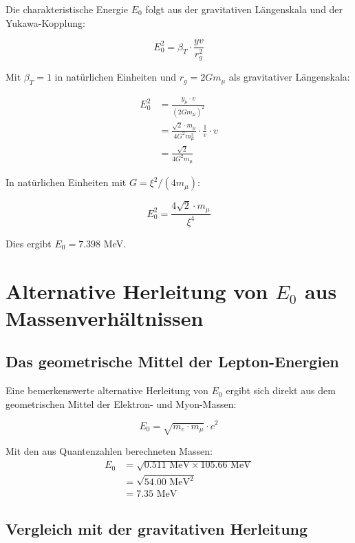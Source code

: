 	Die charakteristische Energie $E_0$ folgt aus der gravitativen Längenskala und der Yukawa-Kopplung:
	
	\begin{equation}
		E_0^2 = \beta_T \cdot \frac{yv}{r_g^2}
	\end{equation}
	
	Mit $\beta_T = 1$ in natürlichen Einheiten und $r_g = 2Gm_\mu$ als gravitativer Längenskala:
	
	\begin{align}
		E_0^2 &= \frac{y_\mu \cdot v}{(2Gm_\mu)^2}\\
		&= \frac{\sqrt{2} \cdot m_\mu}{4G^2 m_\mu^2} \cdot \frac{1}{v} \cdot v\\
		&= \frac{\sqrt{2}}{4G^2 m_\mu}
	\end{align}
	
	In natürlichen Einheiten mit $G = \xi^2/(4m_\mu)$:
	
	\begin{equation}
		E_0^2 = \frac{4\sqrt{2} \cdot m_\mu}{\xi^4}
	\end{equation}
	
	Dies ergibt $E_0 = 7.398$ MeV.
	
	\section{Alternative Herleitung von $E_0$ aus Massenverhältnissen}
	
	\subsection{Das geometrische Mittel der Lepton-Energien}
	
	Eine bemerkenswerte alternative Herleitung von $E_0$ ergibt sich direkt aus dem geometrischen Mittel der Elektron- und Myon-Massen:
	
	\begin{equation}
		E_0 = \sqrt{m_e \cdot m_\mu} \cdot c^2
	\end{equation}
	
	Mit den aus Quantenzahlen berechneten Massen:
	\begin{align}
		E_0 &= \sqrt{0.511 \text{ MeV} \times 105.66 \text{ MeV}}\\
		&= \sqrt{54.00 \text{ MeV}^2}\\
		&= 7.35 \text{ MeV}
	\end{align}
	
	\subsection{Vergleich mit der gravitativen Herleitung}
	
